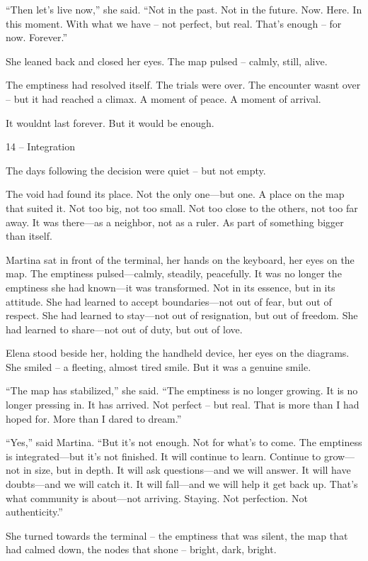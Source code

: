 \documentclass[
]{article}
\begin{document}
``Then let's live now,'' she said. ``Not in the past. Not in the future. Now. Here. In this moment. With what we have -- not perfect, but real. That's enough -- for now. Forever.''

She leaned back and closed her eyes. The map pulsed -- calmly, still, alive.

The emptiness had resolved itself. The trials were over. The encounter wasn\textquotesingle t over -- but it had reached a climax. A moment of peace. A moment of arrival.

It wouldn\textquotesingle t last forever. But it would be enough.

14 -- Integration

The days following the decision were quiet -- but not empty.

The void had found its place. Not the only one---but one. A place on the map that suited it. Not too big, not too small. Not too close to the others, not too far away. It was there---as a neighbor, not as a ruler. As part of something bigger than itself.

Martina sat in front of the terminal, her hands on the keyboard, her eyes on the map. The emptiness pulsed---calmly, steadily, peacefully. It was no longer the emptiness she had known---it was transformed. Not in its essence, but in its attitude. She had learned to accept boundaries---not out of fear, but out of respect. She had learned to stay---not out of resignation, but out of freedom. She had learned to share---not out of duty, but out of love.

Elena stood beside her, holding the handheld device, her eyes on the diagrams. She smiled -- a fleeting, almost tired smile. But it was a genuine smile.

``The map has stabilized,'' she said. ``The emptiness is no longer growing. It is no longer pressing in. It has arrived. Not perfect -- but real. That is more than I had hoped for. More than I dared to dream.''

``Yes,'' said Martina. ``But it's not enough. Not for what's to come. The emptiness is integrated---but it's not finished. It will continue to learn. Continue to grow---not in size, but in depth. It will ask questions---and we will answer. It will have doubts---and we will catch it. It will fall---and we will help it get back up. That's what community is about---not arriving. Staying. Not perfection. Not authenticity.''

She turned towards the terminal -- the emptiness that was silent, the map that had calmed down, the nodes that shone -- bright, dark, bright.
\end{document}
